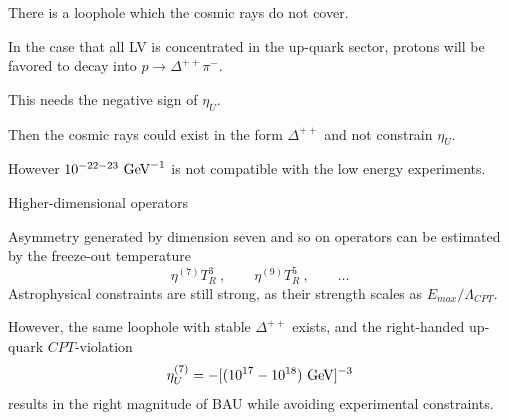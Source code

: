 \documentclass[pdf,UofT06talk,slideColor,colorBG,accumulate]{prosper}
\newcommand{\GeV}{{\rm GeV}}
\begin{document}
\begin{slide}{}

	There is a loophole which the cosmic rays do not cover.
\vspace{0.2cm}

	In the case that all LV is concentrated in the up-quark
	sector, protons will be favored to decay into 
	$ p \to \Delta^{++} \pi^- $.
\vspace{0.2cm}

	This needs the negative sign of $ \eta_U $.
\vspace{0.2cm}

	Then the cosmic rays could exist in the form $ \Delta^{++} $
	and not constrain $ \eta_U $.
\vspace{0.2cm}

	However $ 10^{-22-23}~\GeV^{-1} $ is not compatible 
	with the low energy experiments.

\end{slide}

\begin{slide}{Higher-dimensional operators}

	Asymmetry generated by dimension seven and so on operators
	can be estimated by the freeze-out temperature
\[
	\eta^{(7)} T_R^3 ~,\qquad \eta^{(9)} T_R^5~,\qquad \dots
\]
	Astrophysical constraints are still strong, as their strength
	scales as $ E_{max}/ \Lambda_{CPT} $.

	However, the same loophole with stable $ \Delta^{++} $ exists,
	and the right-handed up-quark $ CPT $-violation
\[
\eta^{(7)}_U = - [(10^{17}-10^{18})~ {\rm GeV}]^{-3}
\]
	results in the right magnitude of BAU while avoiding experimental
	constraints.

\end{slide}
\end{document}
